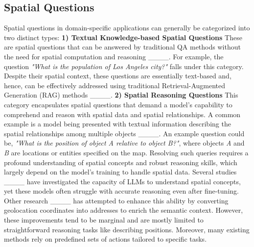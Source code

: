 \subsection{Spatial Questions}
Spatial questions in domain-specific applications can generally be categorized into two distinct types:
\textbf{1) Textual Knowledge-based Spatial Questions} These are spatial questions that can be answered by traditional QA methods without the need for spatial computation and reasoning ____.
For example, the question \textit{"What is the population of Los Angeles city?"} falls under this category. Despite their spatial context, these questions are essentially text-based and, hence, can be effectively addressed using traditional Retrieval-Augmented Generation (RAG) methods ____.
\textbf{2) Spatial Reasoning Questions} This category encapsulates spatial questions that demand a model's capability to comprehend and reason with spatial data and spatial relationships. A common example is a model being presented with textual information describing the spatial relationships among multiple objects ____. An example question could be, \textit{"What is the position of object A relative to object B?"}, where objects \textit{A} and \textit{B} are locations or entities specified on the map. Resolving such queries requires a profound understanding of spatial concepts and robust reasoning skills, which largely depend on the model’s training to handle spatial data.
Several studies  ____ have investigated the capacity of LLMs to understand spatial concepts, yet these models often struggle with accurate reasoning even after fine-tuning.   Other research ____ has attempted to enhance this ability by converting geolocation coordinates into addresses to enrich the semantic context.   However, these improvements tend to be marginal and are mostly limited to straightforward reasoning tasks like describing positions. Moreover, many existing methods rely on predefined sets of actions tailored to specific tasks.